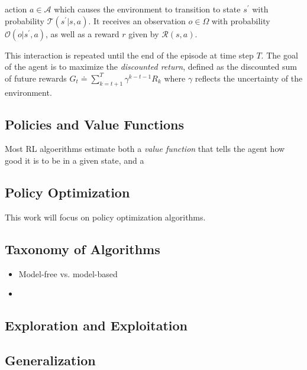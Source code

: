 action \(a \in \mathcal{A}\) which causes the environment to transition to state \(s^\prime\) with probability \(\mathcal{T}(s^\prime | s, a)\).
It receives an observation \(o \in \Omega\) with probability \(\mathcal{O}(o | s^\prime, a)\), as well as a reward \(r\) given by \(\mathcal{R}(s, a)\).

This interaction is repeated until the end of the episode at time step \(T\). The goal of the agent is to maximize the \textit{discounted return}, defined as the discounted sum of future rewards \(G_t \doteq \sum_{k=t+1}^T \gamma^{k-t-1} R_{k}\) where \(\gamma\) reflects the uncertainty of the environment.





\subsection{Policies and Value Functions}

Most RL algoerithms estimate both a \textit{value function} that tells the agent how good it is to be in a given state, and a 

\subsection{Policy Optimization}

This work will focus on policy optimization algorithms.

\subsection{Taxonomy of Algorithms}

\begin{itemize}
    \item Model-free vs. model-based
    \item 
\end{itemize}

\subsection{Exploration and Exploitation}


\subsection{Generalization}


